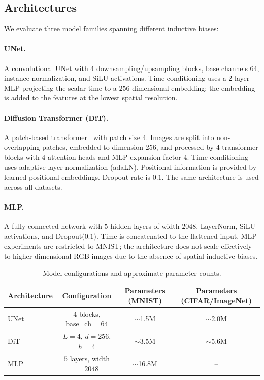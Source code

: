 \documentclass[11pt]{article}
\begin{document}
\subsection{Architectures}

We evaluate three model families spanning different inductive biases:

\paragraph{UNet.} A convolutional UNet with $4$ downsampling/upsampling blocks, 
base channels $64$, instance normalization, and SiLU activations. Time 
conditioning uses a 2-layer MLP projecting the scalar time to a $256$-dimensional 
embedding; the embedding is added to the features at the lowest spatial resolution.

\paragraph{Diffusion Transformer (DiT).} A patch-based 
transformer~\cite{peebles2023scalable} with patch size $4$. Images are split 
into non-overlapping patches, embedded to dimension $256$, and processed by 
$4$ transformer blocks with $4$ attention heads and MLP expansion factor $4$. 
Time conditioning uses adaptive layer normalization (adaLN). Positional 
information is provided by learned positional embeddings. Dropout rate is 
$0.1$. The same architecture is used across all datasets.

\paragraph{MLP.} A fully-connected network with $5$ hidden layers of width 
$2048$, LayerNorm, SiLU activations, and Dropout($0.1$). Time is concatenated 
to the flattened input. MLP experiments are restricted to MNIST; the 
architecture does not scale effectively to higher-dimensional RGB images due 
to the absence of spatial inductive biases.

\begin{table}[htbp]
\centering
\caption{Model configurations and approximate parameter counts.}
\label{tab:architectures}
\begin{tabular}{@{}lccc@{}}
\toprule
Architecture & Configuration & Parameters (MNIST) & Parameters (CIFAR/ImageNet) \\
\midrule
UNet & $4$ blocks, base\_ch$=64$ & $\sim$1.5M & $\sim$2.0M \\
DiT & $L=4$, $d=256$, $h=4$ & $\sim$3.5M & $\sim$5.6M \\
MLP & $5$ layers, width$=2048$ & $\sim$16.8M & -- \\
\bottomrule
\end{tabular}
\end{table}
\end{document}
